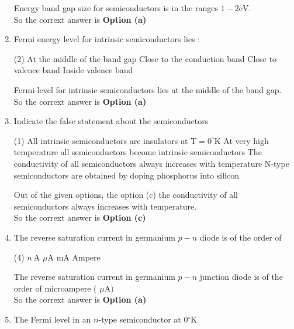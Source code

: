 \begin{enumerate}
	\begin{answer}
	Energy band gap size for semiconductors is in the ranges $1-2 \mathrm{eV}$. \\
	So the corrext answer is \textbf{Option (a)}
	\end{answer}
	\item Fermi energy level for intrinsic semiconductors lies :
	 \begin{tasks}(2)
		\task[\textbf{a.}]At the middle of the band gap
		\task[\textbf{b.}]Close to the conduction band
		\task[\textbf{c.}]Close to valence band
		\task[\textbf{d.}] Inside valence band
	\end{tasks}
	\begin{answer}
		Fermi-level for intrinsic semiconductors lies at the middle of the band gap. \\
		So the corrext answer is \textbf{Option (a)}
	\end{answer}
	\item Indicate the false statement about the semiconductors
	 \begin{tasks}(1)
		\task[\textbf{a.}]All intrinsic semiconductors are insulators at $\mathrm{T}=0^{\circ} \mathrm{K}$
		\task[\textbf{b.}]At very high temperature all semiconductors become intrinsic semiconductors
		\task[\textbf{c.}] The conductivity of all semiconductors always increases with temperature
		\task[\textbf{d.}] N-type semiconductors are obtained by doping phosphorus into silicon
	\end{tasks}
	\begin{answer}
			Out of the given options, the option (c) the conductivity of all semiconductors always increases with temperature.\\
		So the corrext answer is \textbf{Option (c)}
	\end{answer}
\item The reverse saturation current in germanium $p-n$ diode is of the order of
	 \begin{tasks}(4)
		\task[\textbf{a.}]$n \mathrm{~A}$
		\task[\textbf{b.}]$\mu \mathrm{A}$
		\task[\textbf{c.}] $\mathrm{mA}$
		\task[\textbf{d.}] Ampere
	\end{tasks}
	\begin{answer}
	The reverse saturation current in germanium $p-n$ junction diode is of the order of microampere ( $\mu \mathrm{A})$\\
		So the corrext answer is \textbf{Option (a)}
	\end{answer}
\item The Fermi level in an $n$-type semiconductor at $0{ }^{\circ} \mathrm{K}$

\end{enumerate}
